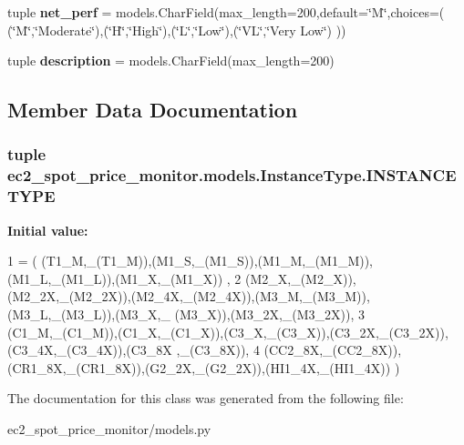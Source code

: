 \begin{DoxyCompactItemize}
\item 
\hypertarget{classec2__spot__price__monitor_1_1models_1_1InstanceType_a850c941b416f51a93f1eb55d567458aa}{tuple {\bfseries net\-\_\-perf} = models.\-Char\-Field(max\-\_\-length=200,default=\char`\"{}M\char`\"{},choices=( (\char`\"{}M\char`\"{},\char`\"{}Moderate\char`\"{}),(\char`\"{}H\char`\"{},\char`\"{}High\char`\"{}),(\char`\"{}L\char`\"{},\char`\"{}Low\char`\"{}),(\char`\"{}V\-L\char`\"{},\char`\"{}Very Low\char`\"{}) ))}\label{classec2__spot__price__monitor_1_1models_1_1InstanceType_a850c941b416f51a93f1eb55d567458aa}

\item 
\hypertarget{classec2__spot__price__monitor_1_1models_1_1InstanceType_a155f0b92413fea9af3fd672c6d80380b}{tuple {\bfseries description} = models.\-Char\-Field(max\-\_\-length=200)}\label{classec2__spot__price__monitor_1_1models_1_1InstanceType_a155f0b92413fea9af3fd672c6d80380b}

\end{DoxyCompactItemize}


\subsection{Member Data Documentation}
\hypertarget{classec2__spot__price__monitor_1_1models_1_1InstanceType_a7a028a8dbbfc1a68f301c602a7bca78c}{
\subsubsection[{I\-N\-S\-T\-A\-N\-C\-E\-T\-Y\-P\-E}]{\setlength{\rightskip}{0pt plus 5cm}tuple ec2\-\_\-spot\-\_\-price\-\_\-monitor.\-models.\-Instance\-Type.\-I\-N\-S\-T\-A\-N\-C\-E\-T\-Y\-P\-E\hspace{0.3cm}{\ttfamily [static]}}}\label{classec2__spot__price__monitor_1_1models_1_1InstanceType_a7a028a8dbbfc1a68f301c602a7bca78c}
{\bfseries Initial value\-:}
\begin{DoxyCode}
1 = ( (T1\_M,\_(T1\_M)),(M1\_S,\_(M1\_S)),(M1\_M,\_(M1\_M)),(M1\_L,\_(M1\_L)),(M1\_X,\_(M1\_X)) ,
2                      (M2\_X,\_(M2\_X)),(M2\_2X,\_(M2\_2X)),(M2\_4X,\_(M2\_4X)),(M3\_M,\_(M3\_M)),(M3\_L,\_(M3\_L)),(M3\_X,\_
      (M3\_X)),(M3\_2X,\_(M3\_2X)),
3                       (C1\_M,\_(C1\_M)),(C1\_X,\_(C1\_X)),(C3\_X,\_(C3\_X)),(C3\_2X,\_(C3\_2X)),(C3\_4X,\_(C3\_4X)),(C3\_8X
      ,\_(C3\_8X)),
4                       (CC2\_8X,\_(CC2\_8X)),(CR1\_8X,\_(CR1\_8X)),(G2\_2X,\_(G2\_2X)),(HI1\_4X,\_(HI1\_4X)) )
\end{DoxyCode}


The documentation for this class was generated from the following file\-:\begin{DoxyCompactItemize}
\item 
ec2\-\_\-spot\-\_\-price\-\_\-monitor/models.\-py\end{DoxyCompactItemize}
